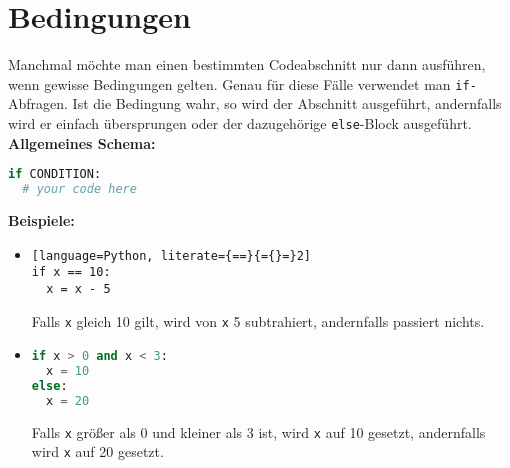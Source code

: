 \documentclass{article}
\begin{document}
	\section{Bedingungen}
	Manchmal möchte man einen bestimmten Codeabschnitt nur dann ausführen, wenn gewisse Bedingungen gelten. Genau für diese Fälle verwendet man \texttt{if-}Abfragen. Ist die Bedingung wahr, so wird der Abschnitt ausgeführt, andernfalls wird er einfach übersprungen oder der dazugehörige \texttt{else}-Block ausgeführt.\\
	\textbf{Allgemeines Schema:}
	\begin{lstlisting}[language=Python]
if CONDITION:
  # your code here
	\end{lstlisting}
	\textbf{Beispiele:}
	\begin{itemize}
		\item \begin{lstlisting}[language=Python, literate={==}{={}=}2]
if x == 10:
  x = x - 5
		\end{lstlisting}
		Falls \texttt{x} gleich 10 gilt, wird von \texttt{x} 5 subtrahiert, andernfalls passiert nichts.
		
		\item \begin{lstlisting}[language=Python]
if x > 0 and x < 3:
  x = 10
else:
  x = 20
		\end{lstlisting}
		Falls \texttt{x} größer als 0 und kleiner als 3 ist, wird \texttt{x} auf 10 gesetzt, andernfalls wird \texttt{x} auf 20 gesetzt.
	\end{itemize}
	
\end{document}
